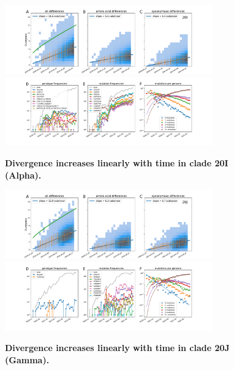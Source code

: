 \begin{figure}[h]
    \includegraphics[width=0.8\textwidth]{figures/rtt/20I_rtt.pdf}
    \includegraphics[width=0.8\textwidth]{figures/counts/20I_counts.pdf}
    \caption{{\bf Divergence increases linearly with time in clade 20I (Alpha).}
    \label{fig:20I_divergence}}
\end{figure}

\begin{figure}[h]
    \includegraphics[width=0.8\textwidth]{figures/rtt/20J_rtt.pdf}
    \includegraphics[width=0.8\textwidth]{figures/counts/20J_counts.pdf}
    \caption{{\bf Divergence increases linearly with time in clade 20J (Gamma).}
    \label{fig:20J_divergence}}
\end{figure}


